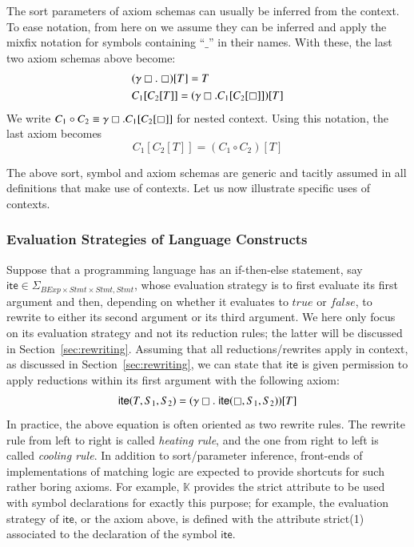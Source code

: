 \documentclass[UTF8,11pt]{article}
\theoremstyle{plain}
\theoremstyle{definition}
\theoremstyle{remark}
\newcommand{\K}{\mbox{$\mathbb{K}$}\xspace}
\newcommand{\hole}{\boxempty}
\newcommand{\BExp}{\textit{BExp}}
\newcommand{\Stmt}{\textit{Stmt}}
\newcommand{\ite}{\textsf{ite}}
\newcommand{\ttrue}{\textit{true}}
\newcommand{\ffalse}{\textit{false}}
\newcommand{\compose}{\circ}
\begin{document}
The sort parameters of axiom schemas can usually be inferred from the context.
To ease notation, from here on we assume they can be inferred and apply the
mixfix notation for symbols containing ``$\_$'' in their names.
With these, the last two axiom schemas above become:
\begin{align*}
& (\gamma \hole .\; \hole)[T] = T \\
& C_1[C_2[T]] = (\gamma \hole . C_1[C_2[\hole]])[T]
\end{align*}
We write
$C_1 \compose C_2 \equiv \gamma \hole . C_1[C_2[\hole]]$
for nested context.
Using this notation, the last axiom becomes
$$
C_1[C_2[T]] = (C_1 \compose C_2) [T]
$$

The above sort, symbol and axiom schemas are generic and tacitly assumed in
all definitions that make use of contexts.
Let us now illustrate specific uses of contexts.

\subsubsection{Evaluation Strategies of Language Constructs}
\label{sec:evaluationstrategies}
Suppose that a programming language has an if-then-else statement,
say $\ite\in\Sigma_{\BExp\times\Stmt\times\Stmt,\Stmt}$,
whose evaluation strategy is to first evaluate its first argument and then, depending
on whether it evaluates to $\ttrue$ or $\ffalse$, to rewrite to either
its second argument or its third argument.
We here only focus on its evaluation strategy and not its reduction rules;
the latter will be discussed in Section~\ref{sec:rewriting}.
Assuming that all reductions/rewrites apply in context, as discussed in
Section~\ref{sec:rewriting}, we can state that $\ite$ is given permission to
apply reductions within its first argument with the following axiom:
$$
\ite(T,S_1,S_2) = (\gamma\hole.\;\ite(\hole,S_1,S_2))[T]
$$
In practice, the above equation is often oriented as two rewrite rules.
The rewrite rule from left to right is called \emph{heating rule},
and the one from right to left is called \emph{cooling rule}.
In addition to sort/parameter inference, front-ends of implementations of
matching logic are expected to provide shortcuts for such rather boring
axioms.
For example, \K provides the \textsf{strict} attribute to be used with symbol
declarations for exactly this purpose; for example, the evaluation strategy
of $\ite$, or the axiom above, is defined with the attribute
\textsf{strict(1)} associated to the declaration of the symbol $\ite$.
\end{document}
